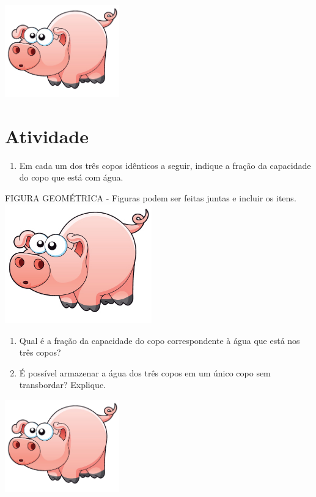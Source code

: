 \documentclass[a4,12pt]{book}
\begin{document}
\includegraphics[width=\textwidth,height=4cm, keepaspectratio]{pig}
\section{Atividade}







\begin{enumerate} [\quad a)] %
  \item     Em cada um dos três copos idênticos a seguir, indique a fração da capacidade do copo que está com água.
\end{enumerate} %
\mbox{} \newline   \begin{imagem*}[breakable]{}{}   FIGURA GEOMÉTRICA - Figuras podem ser feitas juntas e incluir  os itens.      \includegraphics[width=180pt, keepaspectratio]{pig}   \end{imagem*}
\begin{enumerate} [\quad a)] %
  \item     Qual é a fração da capacidade do copo correspondente à água que está nos três copos?
  \item     É possível armazenar a água dos três copos em um único copo sem transbordar? Explique.
\end{enumerate} %







\includegraphics[width=\textwidth,height=4cm, keepaspectratio]{pig}
\end{document}
